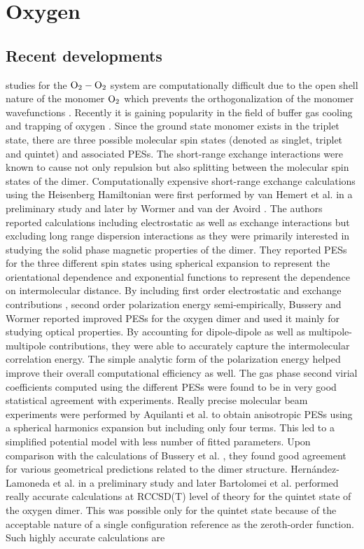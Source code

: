 \chapter{Oxygen}
\section{Recent developments}
    \AbInitio{} studies for the ${\rm O_2 - O_2}$ system are computationally difficult due to the open shell nature of the monomer $\rm{O_2}$ which prevents the orthogonalization of the monomer wavefunctions \cite{Bussery1993}. Recently it is gaining popularity in the field of buffer gas cooling and trapping of oxygen \cite{Friedrich1998,Avdeenkov2001}. Since the ground state monomer exists in the triplet state, there are three possible molecular spin states (denoted as singlet, triplet and quintet) and associated PESs. The short-range exchange interactions were known to cause not only repulsion but also splitting between the molecular spin states of the dimer. Computationally expensive short-range exchange calculations using the Heisenberg Hamiltonian were first performed by van Hemert et al. \cite{vanHemert1983} in a preliminary study and later by Wormer and van der Avoird \cite{Wormer1984}. The authors reported \abInitio{} calculations including electrostatic as well as exchange interactions but excluding long range dispersion interactions as they were primarily interested in studying the solid phase magnetic properties of the dimer. They reported PESs for the three different spin states using spherical expansion to represent the orientational dependence and exponential functions to represent the dependence on intermolecular distance.  By including first order electrostatic and exchange contributions \abInitio{}, second order polarization energy semi-empirically, Bussery and Wormer \cite{Bussery1993} reported improved PESs for the oxygen dimer and used it mainly for studying optical properties. By accounting for dipole-dipole as well as multipole-multipole contributions, they were able to accurately capture the intermolecular correlation energy. The simple analytic form of the polarization energy helped improve their overall computational efficiency as well. The gas phase second virial coefficients computed using the different PESs were found to be in very good statistical agreement with experiments. Really precise molecular beam experiments were performed by Aquilanti et al. \cite{Aquilanti1999} to obtain anisotropic PESs using a spherical harmonics expansion but including only four terms. This led to a simplified potential model with less number of fitted parameters. Upon comparison with the \abInitio{} calculations of Bussery et al. \cite{Bussery1993}, they found good agreement for various geometrical predictions related to the dimer structure. Hernández-Lamoneda et al. \cite{Lamoneda2005CPL} in a preliminary study and later Bartolomei et al. \cite{Bartolomei2008} performed really accurate \abInitio{} calculations at RCCSD(T) level of theory for the quintet state of the oxygen dimer. This was possible only for the quintet state because of the acceptable nature of a single configuration reference as the zeroth-order function. Such highly accurate calculations are 